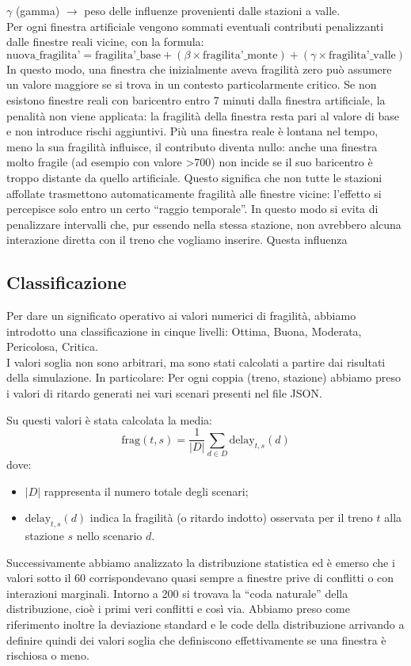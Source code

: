 \documentclass{report}
\begin{document}
$\gamma$ (gamma) $\rightarrow$ peso delle influenze provenienti dalle stazioni a valle.  \\ Per ogni finestra artificiale vengono sommati eventuali contributi penalizzanti dalle finestre reali vicine, con la formula:
\[\text{nuova\_fragilita'} = \text{fragilita'\_base} + (\beta \times \text{fragilita'\_monte}) + (\gamma \times \text{fragilita'\_valle})\]
In questo modo, una finestra che inizialmente aveva fragilità zero può assumere un valore maggiore se si trova in un contesto particolarmente critico.
Se non esistono finestre reali con baricentro entro 7 minuti dalla finestra artificiale, la penalità non viene applicata: la fragilità della finestra resta pari al valore di base e non introduce rischi aggiuntivi. Più una finestra reale è lontana nel tempo, meno la sua fragilità influisce, il contributo diventa nullo: anche una finestra molto fragile (ad esempio con valore >700) non incide se il suo baricentro è troppo distante da quello artificiale.
Questo significa che non tutte le stazioni affollate trasmettono automaticamente fragilità alle finestre vicine: l’effetto si percepisce solo entro un certo “raggio temporale”. In questo modo si evita di penalizzare intervalli che, pur essendo nella stessa stazione, non avrebbero alcuna interazione diretta con il treno che vogliamo inserire.
Questa influenza 

\subsection{Classificazione}
Per dare un significato operativo ai valori numerici di fragilità, abbiamo introdotto una classificazione in cinque livelli: Ottima, Buona, Moderata, Pericolosa, Critica. \\ 
I valori soglia non sono arbitrari, ma sono stati calcolati a partire dai risultati della simulazione. In particolare: 
Per ogni coppia (treno, stazione) abbiamo preso i valori di ritardo generati nei vari scenari presenti nel file JSON.

Su questi valori è stata calcolata la media:
\begin{equation}
\text{frag}(t,s) = \frac{1}{|D|} \sum_{d \in D} \text{delay}_{t,s}(d)
\end{equation}
dove:
\begin{itemize}
    \item $|D|$ rappresenta il numero totale degli scenari;
    \item $\text{delay}_{t,s}(d)$ indica la fragilità (o ritardo indotto) 
    osservata per il treno $t$ alla stazione $s$ nello scenario $d$.
\end{itemize}
Successivamente abbiamo analizzato la distribuzione statistica ed è emerso che i valori sotto il 60 corrispondevano quasi sempre a finestre prive di conflitti o con interazioni marginali. 
Intorno a 200 si trovava la “coda naturale” della distribuzione, cioè i primi veri conflitti e così via.
Abbiamo preso come riferimento inoltre la deviazione standard e le code della distribuzione arrivando a definire quindi dei valori soglia che definiscono effettivamente se una finestra è rischiosa o meno.
\end{document}
